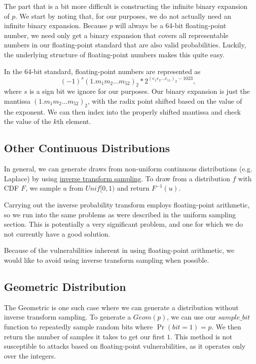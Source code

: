\documentclass[11pt]{scrartcl} %
\begin{document}
The part that is a bit more difficult is constructing the infinite binary expansion of $p$.
We start by noting that, for our purposes, we do not actually need an infinite binary expansion.
Because $p$ will always be a 64-bit floating-point number, we need only get a binary
expansion that covers all representable numbers in our floating-point standard that are
also valid probabilities.
Luckily, the underlying structure of floating-point numbers makes this quite easy. \newline

In the 64-bit standard, floating-point numbers are represented as
\[ (-1)^s(1.m_1m_2 \hdots m_{52})_2 * 2^{(e_{1}e_2 \hdots e_{11})_2 - 1023}, \]
where $s$ is a sign bit we ignore for our purposes.
Our binary expansion is just the mantissa $(1.m_1m_2 \hdots m_{52})_2$, with
the radix point shifted based on the value of the exponent.
We can then index into the properly shifted mantissa and check the value of the $k$th element.

\subsection{Other Continuous Distributions}
In general, we can generate draws from non-uniform continuous distributions (e.g. Laplace)
by using \href{https://en.wikipedia.org/wiki/Inverse_transform_sampling}{inverse transform sampling}.
To draw from a distribution $f$ with CDF $F$,
we sample $u$ from $Unif[0,1)$ and return $F^{-1}(u)$. \newline

\begin{tcolorbox}[colback = {green}, title = {Known Privacy Issues}, colbacktitle = black]
	Carrying out the inverse probability transform employs floating-point arithmetic,
	so we run into the same problems as were described in the uniform sampling section.
	This is potentially a very significant problem, and one for which we do not
	currently have a good solution.
\end{tcolorbox}
Because of the vulnerabilities inherent in using floating-point arithmetic, we would
like to avoid using inverse transform sampling when possible.

\subsection{Geometric Distribution}
The Geometric is one such case where we can generate a distribution without inverse transform sampling.
To generate a $Geom(p)$, we can use our $sample\_bit$ function to
repeatedly sample random bits where $\Pr(bit = 1) = p$. We then return the number of samples
it takes to get our first $1$. This method is not susceptible to attacks based on floating-point vulnerabilities,
as it operates only over the integers. \newline
\end{document}
